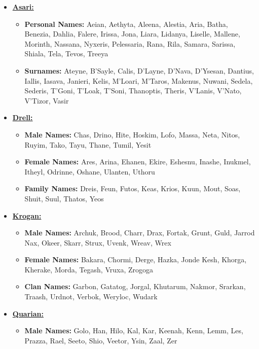\begin{scifitablebox}[screenbox,title=\textcolor{PanelGlow}{Names}]
\begin{itemize}
  \item \textbf{\underline{Asari:}}
  \begin{itemize}
  \item \textbf{Personal Names:} Aeian, Aethyta, Aleena, Alestia, Aria, Batha, Benezia, Dahlia, Falere, Irissa, Jona, Liara, Lidanya, Liselle, Mallene, Morinth, Nassana, Nyxeris, Pelessaria, Rana, Rila, Samara, Sarissa, Shiala, Tela, Tevos, Treeya
  \item \textbf{Surnames:} Ateyne, B'Sayle, Calis, D'Layne, D'Nava, D'Ysesan, Dantius, Iallis, Iasava, Janieri, Kelis, M'Loari, M'Taros, Makenus, Nuwani, Sedela, Sederis, T'Goni, T'Loak, T'Soni, Thanoptis, Theris, V'Lanis, V'Nato, V'Tizor, Vasir
  \end{itemize}
  \item \textbf{\underline{Drell:}}
  \begin{itemize}
    \item \textbf{Male Names:} Chas, Drino, Hite, Hoskim, Lofo, Massa, Neta, Nitos, Ruyim, Tako, Tayu, Thane, Tumil, Yesit
    \item \textbf{Female Names:} Ares, Arina, Ehanen, Ekire, Eshesnu, Inashe, Inukmel, Itheyl, Odrinne, Oshane, Ulanten, Uthoru
    \item \textbf{Family Names:} Dreis, Feun, Futos, Keas, Krios, Kuun, Mout, Soas, Shuit, Suul, Thatos, Yeos
  \end{itemize}
  \item \textbf{\underline{Krogan:}}
  \begin{itemize}
    \item \textbf{Male Names:} Archuk, Brood, Charr, Drax, Fortak, Grunt, Guld, Jarrod Nax, Okeer, Skarr, Strux, Uvenk, Wreav, Wrex
    \item \textbf{Female Names:} Bakara, Chormi, Derge, Hazka, Jonde Kesh, Khorga, Kherake, Morda, Tegash, Vruxa, Zrogoga
    \item \textbf{Clan Names:} Garbon, Gatatog, Jorgal, Khutarum, Nakmor, Srarkan, Traash, Urdnot, Verbok, Weryloc, Wudark
  \end{itemize}
  \item \textbf{\underline{Quarian:}}
  \begin{itemize}
    \item \textbf{Male Names:} Golo, Han, Hilo, Kal, Kar, Keenah, Kenn, Lemm, Les, Prazza, Rael, Seeto, Shio, Veetor, Ysin, Zaal, Zer

\end{itemize}
\end{itemize}
\end{scifitablebox}
